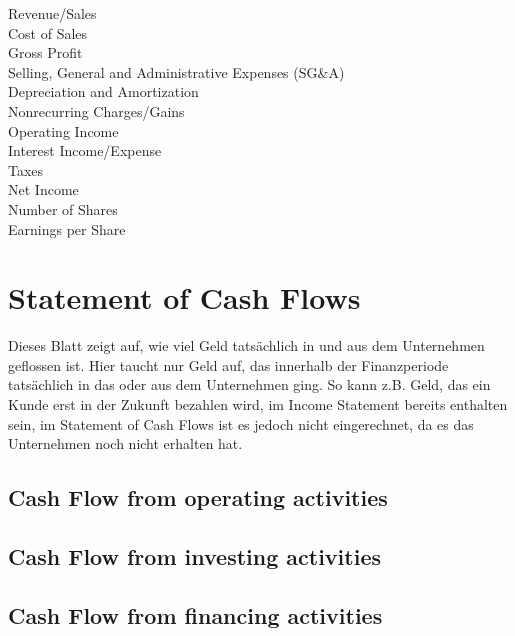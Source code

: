 \begin{description}
    \item[Revenue/Sales]
    \item[Cost of Sales]
    \item[Gross Profit]
    \item[Selling, General and Administrative Expenses (SG\&A)]
    \item[Depreciation and Amortization]
    \item[Nonrecurring Charges/Gains]
    \item[Operating Income]
    \item[Interest Income/Expense]
    \item[Taxes]
    \item[Net Income]
    \item[Number of Shares]
    \item[Earnings per Share]            
\end{description}



\section{Statement of Cash Flows}
Dieses Blatt zeigt auf, wie viel Geld tatsächlich in und aus dem Unternehmen geflossen ist.
Hier taucht nur Geld auf, das innerhalb der Finanzperiode tatsächlich in das oder aus dem Unternehmen ging.
So kann z.B. Geld, das ein Kunde erst in der Zukunft bezahlen wird, im Income Statement bereits enthalten sein, im Statement of Cash Flows ist es jedoch nicht eingerechnet, da es das Unternehmen noch nicht erhalten hat.

\subsection{Cash Flow from operating activities}

\subsection{Cash Flow from investing activities}

\subsection{Cash Flow from financing activities}

